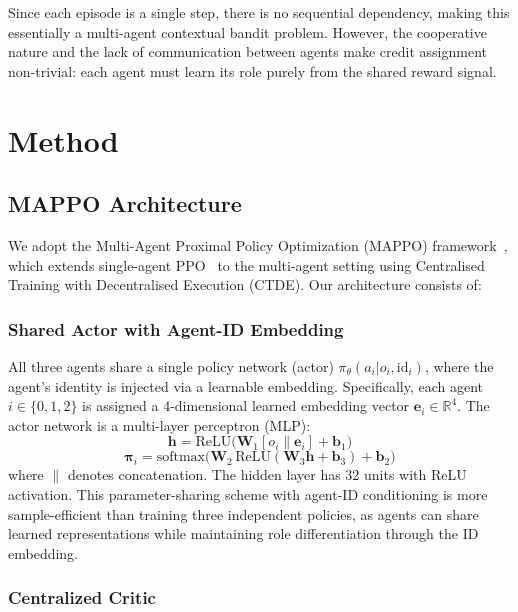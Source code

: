 \documentclass[conference]{IEEEtran}
\begin{document}
Since each episode is a single step, there is no sequential dependency, making this essentially a multi-agent contextual bandit problem. However, the cooperative nature and the lack of communication between agents make credit assignment non-trivial: each agent must learn its role purely from the shared reward signal.

\section{Method}

\subsection{MAPPO Architecture}

We adopt the Multi-Agent Proximal Policy Optimization (MAPPO) framework~\cite{yu2022mappo}, which extends single-agent PPO~\cite{schulman2017ppo} to the multi-agent setting using Centralised Training with Decentralised Execution (CTDE). Our architecture consists of:

\subsubsection{Shared Actor with Agent-ID Embedding}

All three agents share a single policy network (actor) $\pi_\theta(a_i | o_i, \text{id}_i)$, where the agent's identity is injected via a learnable embedding. Specifically, each agent $i \in \{0, 1, 2\}$ is assigned a 4-dimensional learned embedding vector $\mathbf{e}_i \in \mathbb{R}^4$. The actor network is a multi-layer perceptron (MLP):
\begin{equation}
    \mathbf{h} = \text{ReLU}\bigl(\mathbf{W}_1 [o_i \parallel \mathbf{e}_i] + \mathbf{b}_1\bigr)
\end{equation}
\begin{equation}
    \boldsymbol{\pi}_i = \text{softmax}\bigl(\mathbf{W}_2 \, \text{ReLU}(\mathbf{W}_3 \mathbf{h} + \mathbf{b}_3) + \mathbf{b}_2\bigr)
\end{equation}
where $\parallel$ denotes concatenation. The hidden layer has 32 units with ReLU activation. This parameter-sharing scheme with agent-ID conditioning is more sample-efficient than training three independent policies, as agents can share learned representations while maintaining role differentiation through the ID embedding.

\subsubsection{Centralized Critic}
\end{document}
